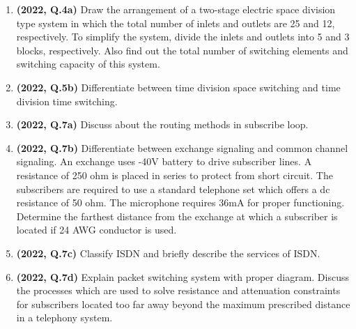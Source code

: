 \documentclass[12pt, a4paper]{article}
\begin{document}
\begin{enumerate}
		\item \textbf{(2022, Q.4a)} Draw the arrangement of a two-stage electric space division type system in which the total number of inlets and outlets are 25 and 12, respectively. To simplify the system, divide the inlets and outlets into 5 and 3 blocks, respectively. Also find out the total number of switching elements and switching capacity of this system.
		\item \textbf{(2022, Q.5b)} Differentiate between time division space switching and time division time switching.
		\item \textbf{(2022, Q.7a)} Discuss about the routing methods in subscribe loop.
		\item \textbf{(2022, Q.7b)} Differentiate between exchange signaling and common channel signaling. An exchange uses -40V battery to drive subscriber lines. A resistance of 250 ohm is placed in series to protect from short circuit. The subscribers are required to use a standard telephone set which offers a dc resistance of 50 ohm. The microphone requires 36mA for proper functioning. Determine the farthest distance from the exchange at which a subscriber is located if 24 AWG conductor is used.
		\item \textbf{(2022, Q.7c)} Classify ISDN and briefly describe the services of ISDN.
		\item \textbf{(2022, Q.7d)} Explain packet switching system with proper diagram. Discuss the processes which are used to solve resistance and attenuation constraints for subscribers located too far away beyond the maximum prescribed distance in a telephony system.
		

\end{enumerate}
\end{document}
